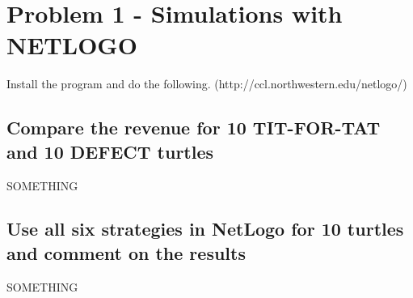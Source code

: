 \section{Problem 1 - Simulations with NETLOGO}
Install the program and do the following. (http://ccl.northwestern.edu/netlogo/)
\subsection{Compare the revenue for 10 TIT-FOR-TAT and 10 DEFECT turtles}

SOMETHING


\subsection{Use all six strategies in NetLogo for 10 turtles and comment on the results}

SOMETHING

